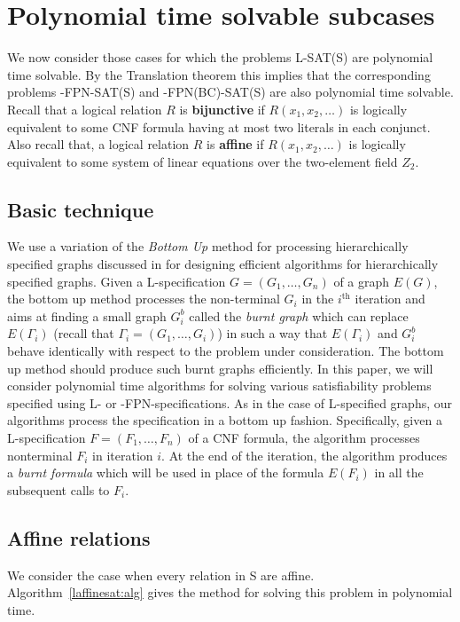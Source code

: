 \section{Polynomial time solvable subcases}\label{sec:poly}

We now consider those  cases for which the problems 
{\sf L-SAT(S)} are polynomial time solvable.
By the Translation theorem this implies that the corresponding 
problems {-FPN-SAT(S)} and  {-FPN(BC)-SAT(S)} 
are also polynomial time solvable.
Recall that a logical relation $R$ is {\bf bijunctive} if
$R(x_1,x_2,\ldots)$ is logically equivalent to some CNF formula having at
most two literals in each conjunct.
Also recall that, 
a logical relation $R$ is {\bf affine} if $R(x_1,x_2,\ldots)$ is logically 
equivalent to some system of linear equations over the two-element field $Z_2$.

\subsection{Basic technique}
We use a variation of the {\it Bottom Up}
method for processing hierarchically  specified graphs discussed 
in \cite{LW87a,Le88,Le89,Wi90}
for designing efficient algorithms for hierarchically specified  graphs. 
Given a {\sf L}-specification $G = (G_1, \ldots, G_n)$ of  a graph $E(G)$,
the bottom up method processes the non-terminal $G_i$ in the $i^{\mathrm{th}}$ iteration
and aims at finding a small graph $G_i^{b}$ called the 
{\it burnt graph} which can replace $E(\Gamma_i)$ 
(recall  that $ \Gamma_i = (G_1, \ldots, G_i)$) 
in such a way that $E(\Gamma_i)$ and $G_i^{b}$ behave 
identically with respect to the problem
under consideration.
The bottom up method should produce such burnt graphs efficiently.
In this paper, we will consider polynomial time algorithms for solving
various satisfiability problems specified using {\sf L}- or 
{-FPN}-specifications. As in the case of {\sf L}-specified graphs, 
our algorithms process the specification in a bottom up fashion. Specifically,
given a {\sf L}-specification $F = (F_1, \ldots, F_n)$ of a {\sf CNF}
formula, the algorithm processes nonterminal $F_i$ in iteration $i$. At the end
of the iteration, the algorithm produces a {\em burnt formula} which will
be used in place of the formula $E(F_i)$ in all the subsequent calls to $F_i$.





\subsection{Affine relations}
We consider the case when every relation in {\sf S} are affine. 
Algorithm~\ref{laffinesat:alg} gives the method for solving this problem in 
polynomial time.


